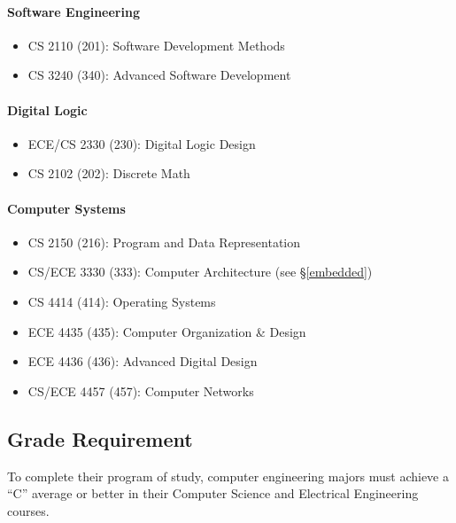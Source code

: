\documentclass[10pt,letter]{book}
\newenvironment{itemlist}{
\begin{itemize}
\setlength{\itemsep}{0pt}
\setlength{\parskip}{0pt}}
{\end{itemize}}
\begin{document}
\paragraph{Software Engineering}
\begin{itemlist}
\item CS 2110 (201): Software Development Methods
\item CS 3240 (340): Advanced Software Development
\end{itemlist}

\paragraph{Digital Logic}
\begin{itemlist}
\item ECE/CS 2330 (230): Digital Logic Design
\item CS 2102 (202): Discrete Math
\end{itemlist}

\paragraph{Computer Systems}
\begin{itemlist}
\item CS 2150 (216): Program and Data Representation
\item CS/ECE 3330 (333): Computer Architecture (see \S\ref{embedded})
\item CS 4414 (414): Operating Systems
\item ECE 4435 (435): Computer Organization \& Design
\item ECE 4436 (436): Advanced Digital Design
\item CS/ECE 4457 (457): Computer Networks
\end{itemlist}

\subsection{Grade Requirement}
To complete their program of study, computer engineering majors must
achieve a “C” average or better in their Computer Science and
Electrical Engineering courses.


\end{document}
